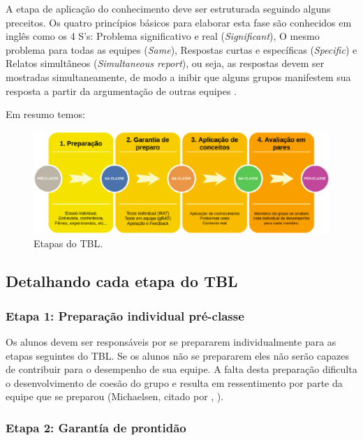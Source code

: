 A etapa de aplicação do conhecimento deve ser estruturada seguindo alguns preceitos. Os quatro princípios básicos para elaborar esta fase são conhecidos em inglês como os 4 S’s: Problema significativo e real (\textit{Significant}), O mesmo problema para todas as equipes (\textit{Same}), Respostas curtas e específicas (\textit{Specific}) e Relatos simultâneos (\textit{Simultaneous report}), ou seja, as respostas devem ser mostradas simultaneamente, de modo a inibir que alguns grupos manifestem sua resposta a partir da argumentação de outras equipes \cite{bollela}.

Em resumo temos:

\begin{figure}[h!]
	\centering
  \includegraphics[keepaspectratio=true,scale=0.5]{figuras/tbl2.eps}
  \caption{Etapas do TBL. \cite{bollela}}
	\label{fig:tbl2}
\end{figure}

\subsection{Detalhando cada etapa do TBL}

\subsubsection{Etapa 1: Preparação individual pré-classe}

Os alunos devem ser responsáveis por se prepararem individualmente para as etapas seguintes do TBL. Se os alunos não se prepararem eles não serão capazes de contribuir para o desempenho de sua equipe. A falta desta preparação dificulta o desenvolvimento de coesão do grupo e resulta em ressentimento por parte da equipe que se preparou (Michaelsen, citado por \citeauthor{bollela}, \citeyear{bollela}).

\subsubsection{Etapa 2: Garantía de prontidão}

